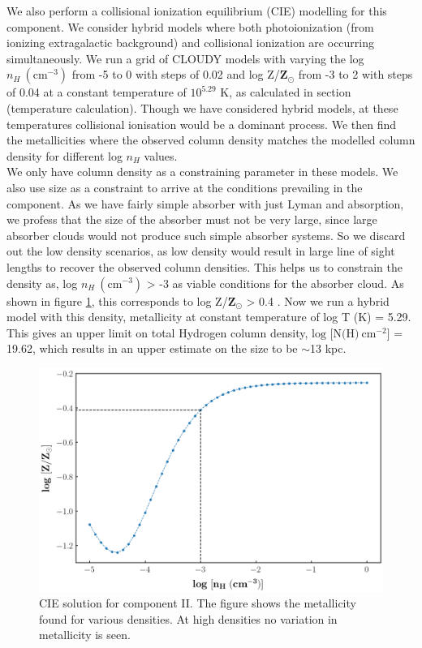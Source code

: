 We also perform a collisional ionization equilibrium (CIE) modelling for this component. We consider hybrid models where both photoionization (from ionizing extragalactic background) and collisional ionization are occurring simultaneously. We run a grid of CLOUDY models with varying the log $n_H \ (\text{cm}^{-3})$ from -5 to 0 with steps of 0.02 and log Z/$\mathbf{\text{Z}_{\odot}}$ from -3 to 2 with steps of 0.04 at a constant temperature of $10^{5.29}$ K, as calculated in section (temperature calculation). Though we have considered hybrid models, at these temperatures collisional ionisation would be a dominant process. We then find the metallicities where the observed  column density matches the modelled column density for different log $n_H$ values.  
\\
We only have  column density as a constraining parameter in these models. We also use size as a constraint to arrive at the conditions prevailing in the component. As we have fairly simple absorber with just Lyman and  absorption, we profess that the size of the absorber must not be very large, since large absorber clouds would not produce such simple absorber systems. So we discard out the low density scenarios, as low density would result in large line of sight lengths to recover the observed column densities. This helps us to constrain the density as, log $n_H \ (\text{cm}^{-3})$ > -3 as viable conditions for the absorber cloud. As shown in figure \ref{fig:comp_II_CIE}, this corresponds to log Z/$\mathbf{\text{Z}_{\odot}}$ > 0.4 . Now we run a hybrid model with this density, metallicity at constant temperature of log T (K) = 5.29. This gives an upper limit on total  Hydrogen column density, $\text{log [N(H)} \ \text{cm}^{-2}]$ = 19.62, which results in an upper estimate on the size to be $\sim$13 kpc.
%
\begin{figure}[!t]
\includegraphics[width=\linewidth]{Figures/comp-II-CIE.png}
\caption{CIE solution for component II. The figure shows the metallicity found for various densities. At high densities no variation in metallicity is seen.}
\label{fig:comp_II_CIE}
\end{figure}

